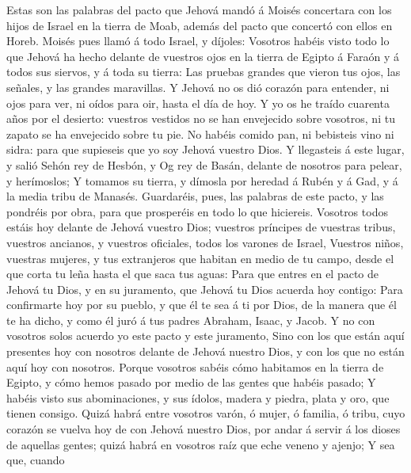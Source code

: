  Estas son las palabras del pacto que Jehová mandó á Moisés
concertara con los hijos de Israel en la tierra de Moab, además del
pacto que concertó con ellos en Horeb.  Moisés pues llamó á
todo Israel, y díjoles: Vosotros habéis visto todo lo que Jehová ha
hecho delante de vuestros ojos en la tierra de Egipto á Faraón y á todos
sus siervos, y á toda su tierra:  Las pruebas grandes que
vieron tus ojos, las señales, y las grandes maravillas.  Y
Jehová no os dió corazón para entender, ni ojos para ver, ni oídos para
oir, hasta el día de hoy.  Y yo os he traído cuarenta años
por el desierto: vuestros vestidos no se han envejecido sobre vosotros,
ni tu zapato se ha envejecido sobre tu pie.  No habéis
comido pan, ni bebisteis vino ni sidra: para que supieseis que yo soy
Jehová vuestro Dios.  Y llegasteis á este lugar, y salió
Sehón rey de Hesbón, y Og rey de Basán, delante de nosotros para pelear,
y herímoslos;  Y tomamos su tierra, y dímosla por heredad á
Rubén y á Gad, y á la media tribu de Manasés.  Guardaréis,
pues, las palabras de este pacto, y las pondréis por obra, para que
prosperéis en todo lo que hiciereis.  Vosotros todos estáis
hoy delante de Jehová vuestro Dios; vuestros príncipes de vuestras
tribus, vuestros ancianos, y vuestros oficiales, todos los varones de
Israel,  Vuestros niños, vuestras mujeres, y tus
extranjeros que habitan en medio de tu campo, desde el que corta tu leña
hasta el que saca tus aguas:  Para que entres en el pacto
de Jehová tu Dios, y en su juramento, que Jehová tu Dios acuerda hoy
contigo:  Para confirmarte hoy por su pueblo, y que él te
sea á ti por Dios, de la manera que él te ha dicho, y como él juró á tus
padres Abraham, Isaac, y Jacob.  Y no con vosotros solos
acuerdo yo este pacto y este juramento,  Sino con los que
están aquí presentes hoy con nosotros delante de Jehová nuestro Dios, y
con los que no están aquí hoy con nosotros.  Porque
vosotros sabéis cómo habitamos en la tierra de Egipto, y cómo hemos
pasado por medio de las gentes que habéis pasado;  Y habéis
visto sus abominaciones, y sus ídolos, madera y piedra, plata y oro, que
tienen consigo.  Quizá habrá entre vosotros varón, ó mujer,
ó familia, ó tribu, cuyo corazón se vuelva hoy de con Jehová nuestro
Dios, por andar á servir á los dioses de aquellas gentes; quizá habrá en
vosotros raíz que eche veneno y ajenjo;  Y sea que, cuando
